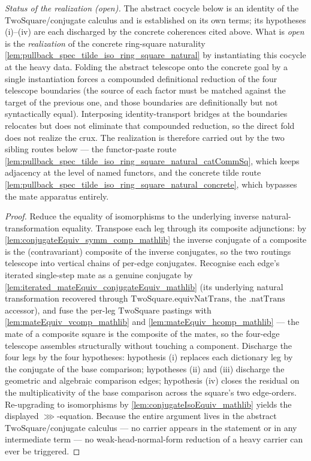 \begin{lemma}
  \medskip
  \emph{Status of the realization (open).} The abstract cocycle below is an identity of the
  \(\mathrm{TwoSquare}\)/conjugate calculus and is established on its own terms; its hypotheses
  (i)--(iv) are each discharged by the concrete coherences cited above. What is \emph{open} is the
  \emph{realization} of the concrete ring-square naturality
  \cref{lem:pullback_spec_tilde_iso_ring_square_natural} by instantiating this cocycle at the heavy
  data. Folding the abstract telescope onto the concrete goal by a single instantiation forces a
  compounded definitional reduction of the four telescope boundaries (the source of each factor must
  be matched against the target of the previous one, and those boundaries are definitionally but not
  syntactically equal). Interposing identity-transport bridges at the boundaries relocates but does
  not eliminate that compounded reduction, so the direct fold does not realize the crux. The
  realization is therefore carried out by the two sibling routes below — the functor-paste route
  \cref{lem:pullback_spec_tilde_iso_ring_square_natural_catCommSq}, which keeps adjacency at the
  level of named functors, and the concrete tilde route
  \cref{lem:pullback_spec_tilde_iso_ring_square_natural_concrete}, which bypasses the mate apparatus
  entirely.
  \begin{proof}
    Reduce the equality of isomorphisms to the underlying inverse natural-transformation equality.
    Transpose each leg through its composite adjunctions: by \cref{lem:conjugateEquiv_symm_comp_mathlib}
    the inverse conjugate of a composite is the (contravariant) composite of the inverse conjugates, so
    the two routings telescope into vertical chains of per-edge conjugates. Recognise each edge's
    iterated single-step mate as a genuine conjugate by
    \cref{lem:iterated_mateEquiv_conjugateEquiv_mathlib} (its underlying natural transformation recovered
    through \(\mathrm{TwoSquare.equivNatTrans}\), the \(\mathrm{.natTrans}\) accessor), and fuse the
    per-leg \(\mathrm{TwoSquare}\) pastings with \cref{lem:mateEquiv_vcomp_mathlib} and
    \cref{lem:mateEquiv_hcomp_mathlib} --- the mate of a composite square is the composite of the mates,
    so the four-edge telescope assembles structurally without touching a component. Discharge the four
    legs by the four hypotheses: hypothesis (i) replaces each dictionary leg by the conjugate of the
    base comparison; hypotheses (ii) and (iii) discharge the geometric and algebraic comparison edges;
    hypothesis (iv) closes the residual on the multiplicativity of the base comparison across the
    square's two edge-orders. Re-upgrading to isomorphisms by \cref{lem:conjugateIsoEquiv_mathlib} yields
    the displayed \(\ggg\)-equation. Because the entire argument lives in the abstract
    \(\mathrm{TwoSquare}\)/conjugate calculus --- no carrier appears in the statement or in any
    intermediate term --- no weak-head-normal-form reduction of a heavy carrier can ever be triggered.
  \end{proof}
\end{lemma}

